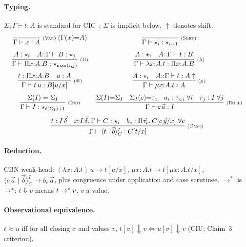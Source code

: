 \paragraph{Typing.}
$\Sigma;\Gamma\vdash t:A$ is standard for
CIC~\cite{coquand-huet-1988-coc,paulin-mohring-1993-inductive};
$\Sigma$ is implicit below, $\uparrow$ denotes shift.
\[
\begin{array}{c@{\quad}c}
\dfrac{}{\Gamma\vdash x:A}\;{\scriptstyle(\textsc{Var})}\;(\Gamma(x){=}A)
&
\dfrac{}{\Gamma\vdash\star_i:\star_{i+1}}\;{\scriptstyle(\textsc{Sort})}
\\[14pt]
\dfrac{A:\star_i\quad A{::}\Gamma\vdash B:\star_j}%
      {\Gamma\vdash\Pi x{:}A.B:\star_{\max(i,j)}}\;{\scriptstyle(\Pi)}
&
\dfrac{A:\star_i\quad A{::}\Gamma\vdash t:B}%
      {\Gamma\vdash\lambda x{:}A.t:\Pi x{:}A.B}\;{\scriptstyle(\lambda)}
\\[14pt]
\dfrac{t:\Pi x{:}A.B\quad u:A}%
      {\Gamma\vdash t\,u:B[u/x]}\;{\scriptstyle(@)}
&
\dfrac{A:\star_i\quad A{::}\Gamma\vdash t:A\uparrow}%
      {\Gamma\vdash\mu x{:}A.t:A}\;{\scriptstyle(\mu)}
\\[14pt]
\dfrac{\Sigma(I)=\Sigma_I}%
      {\Gamma\vdash I:\star_{\ell(\Sigma_I)+1}}\;{\scriptstyle(\textsc{Ind})}
&
\dfrac{\Sigma(I){=}\Sigma_I\quad \Sigma_I(c){=}\tau_c\quad
       a_i:\tau_{c,i}\;\forall i\quad r_j:I\;\forall j}%
      {\Gamma\vdash c\,\vec a:I}\;{\scriptstyle(\textsc{Roll})}
\\[14pt]
\multicolumn{2}{c}{%
  \dfrac{t:I\,\vec\delta\quad
         x{:}I\,\vec\delta,\Gamma\vdash C:\star_i\quad
         b_c:\Pi\vec\tau_c.\,C[c\,\vec y/x]\;\forall c}%
        {\Gamma\vdash\langle t \mid \vec b \rangle^I_C:C[t/x]}\;{\scriptstyle(\textsc{Case})}
}
\end{array}
\]

\paragraph{Reduction.}
CBN weak-head: $(\lambda x{:}A.t)\,u\to t[u/x]$,\;
$\mu x{:}A.t\to t[\mu x{:}A.t/x]$,\;
$\langle c\,\vec a \mid \vec b \rangle^I_C\to b_c\,\vec a$,
plus congruence under application and case scrutinee.
$\to^*$ is $\to^{*}$; $t\Downarrow v$ means $t\to^{*} v$, $v$ a value.

\paragraph{Observational equivalence.}
$t\approx u$ iff for all closing $\sigma$ and values $v$,
$t[\sigma]\Downarrow v\Leftrightarrow u[\sigma]\Downarrow v$
(CIU; Claim~3 criterion).
